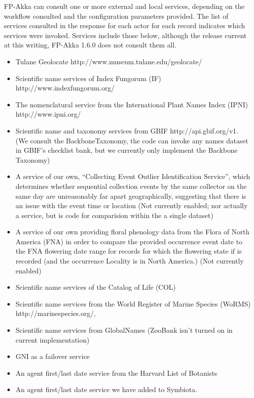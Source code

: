 \documentclass{article}
\begin{document}
 FP-Akka can consult one or more external and local services, depending on the workflow consulted and the configuration parameters provided. The list of services consulted in the response for each actor for each record indicates which services were invoked. Services include those below, although the release current at this writing, FP-Akka 1.6.0 \citep{FPA_160} does not consult them all. 
\begin{itemize}
  \item Tulane Geolocate http://www.museum.tulane.edu/geolocate/
  \item Scientific name services of Index Fungorum (IF) http://www.indexfungorum.org/
  \item The nomenclatural service from the International Plant Names Index (IPNI) http://www.ipni.org/
  \item Scientific name and taxonomy services from GBIF http://api.gbif.org/v1.  (We consult the BackboneTaxonomy, the code can invoke any names dataset in GBIF's checklist bank, but we currently only implement the Backbone Taxonomy)
  \item A service of our own, ``Collecting Event Outlier Identification Service'', which determines whether sequential collection events by the same collector on the same day are  unreasonably far apart geographically, suggesting that there is an issue with the event time or location (Not currently enabled; nor actually a service, but is code for comparision within the a single dataset)
  \item A service of our own providing floral phenology data from the Flora of North America  (FNA) \citep{fna_flora_2008} in order to compare  the provided occurrence event date to the FNA flowering date range for records for which the flowering state if is recorded (and the occurrence Locality is in North America.) (Not currently enabled)
  \item Scientific name services of the Catalog of Life (COL)
  \item Scientific name services from the World Register of Marine Species (WoRMS) http://marinespecies.org/, 
  \item Scientific name services from  GlobalNames (ZooBank isn't turned on in current implementation)
  \item GNI as a failover service
  \item An agent first/last date service from the Harvard List of Botanists 
  \item An agent first/last date service we have added to Symbiota.
\end{itemize}
\end{document}
